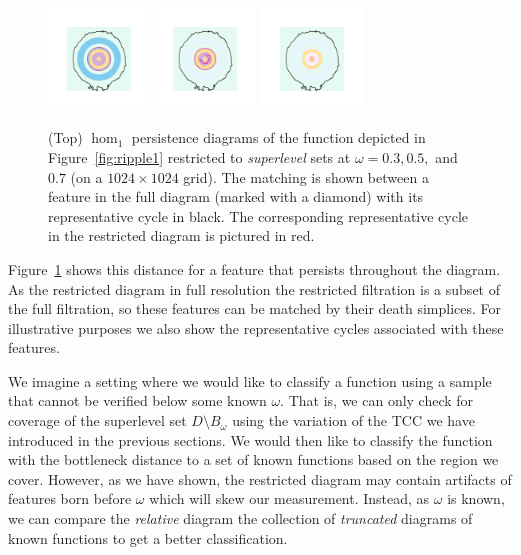 \begin{figure}[htbp]
  \includegraphics[trim=500 500 500 500, clip, width=0.24\textwidth]{figures/matching-surf_top-1_0.png}
  \includegraphics[trim=500 500 500 500, clip, width=0.24\textwidth]{figures/matching-surf_top-1_1.png}
  \includegraphics[trim=500 500 500 500, clip, width=0.24\textwidth]{figures/matching-surf_top-1_2.png}
  \caption{(Top) $\hom_1$ persistence diagrams of the function depicted in Figure~\ref{fig:ripple1} restricted to \emph{superlevel} sets at $\omega = 0.3, 0.5,$ and $0.7$ (on a $1024\times 1024$ grid).
  The matching is shown between a feature in the full diagram (marked with a diamond) with its representative cycle in black.
  The corresponding representative cycle in the restricted diagram is pictured in red.}\label{fig:restricted}
\end{figure}

Figure~\ref{fig:restricted} shows this distance for a feature that persists throughout the diagram.
As the restricted diagram in full resolution the restricted filtration is a subset of the full filtration, so these features can be matched by their death simplices.
For illustrative purposes we also show the representative cycles associated with these features.

We imagine a setting where we would like to classify a function using a sample that cannot be verified below some known $\omega$.
That is, we can only check for coverage of the superlevel set $D\setminus B_\omega$ using the variation of the TCC we have introduced in the previous sections.
We would then like to classify the function with the bottleneck distance to a set of known functions based on the region we cover.
However, as we have shown, the restricted diagram may contain artifacts of features born before $\omega$ which will skew our measurement.
Instead, as $\omega$ is known, we can compare the \emph{relative} diagram the collection of \emph{truncated} diagrams of known functions to get a better classification.

